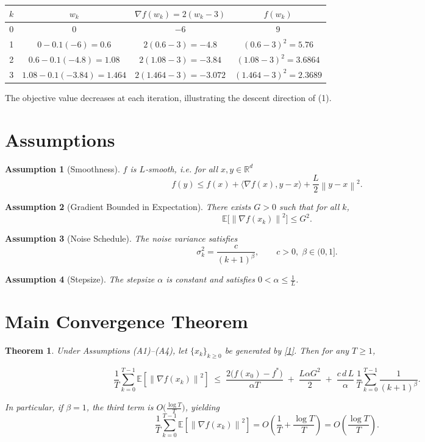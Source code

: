 \documentclass{article}
\newtheorem{theorem}{Theorem}
\newtheorem{assumption}{Assumption}
\newcommand{\E}{\mathbb{E}}
\newcommand{\R}{\mathbb{R}}
\newcommand{\norm}[1]{\left\|#1\right\|}
\newcommand{\ip}[2]{\langle #1,#2\rangle}
\begin{document}
\begin{center}
\begin{tabular}{c|c|c|c}
$k$ & $w_{k}$ & $\nabla f(w_{k})=2(w_{k}-3)$ & $f(w_{k})$\\ \hline
0 & $0$ & $-6$ & $9$\\
1 & $0-0.1(-6)=0.6$ & $2(0.6-3)=-4.8$ & $(0.6-3)^{2}=5.76$\\
2 & $0.6-0.1(-4.8)=1.08$ & $2(1.08-3)=-3.84$ & $(1.08-3)^{2}=3.6864$\\
3 & $1.08-0.1(-3.84)=1.464$ & $2(1.464-3)=-3.072$ & $(1.464-3)^{2}=2.3689$
\end{tabular}
\end{center}
The objective value decreases at each iteration, illustrating the descent direction of (1).

\newpage
\section*{Assumptions}
\begin{assumption}[Smoothness]
$f$ is $L$‑smooth, i.e. for all $x,y\in\R^{d}$
\[
f(y)\le f(x)+\ip{\nabla f(x)}{y-x}+\frac{L}{2}\norm{y-x}^{2}.
\tag{A1}
\]
\end{assumption}
\begin{assumption}[Gradient Bounded in Expectation]
There exists $G>0$ such that for all $k$,
\[
\E\bigl[\norm{\nabla f(x_{k})}^{2}\bigr]\le G^{2}.
\tag{A2}
\]
\end{assumption}
\begin{assumption}[Noise Schedule]
The noise variance satisfies
\[
\sigma_{k}^{2}= \frac{c}{(k+1)^{\beta}},\qquad c>0,\; \beta\in(0,1].
\tag{A3}
\]
\end{assumption}
\begin{assumption}[Stepsize]
The stepsize $\alpha$ is constant and satisfies $0<\alpha\le\frac{1}{L}$.
\end{assumption}

\section*{Main Convergence Theorem}
\begin{theorem}
\label{thm:main}
Under Assumptions (A1)–(A4), let $\{x_{k}\}_{k\ge0}$ be generated by \eqref{1}. Then for any $T\ge 1$,

\[
\frac{1}{T}\sum_{k=0}^{T-1}\E\!\left[\norm{\nabla f(x_{k})}^{2}\right]
\;\le\;
\frac{2\bigl(f(x_{0})-f^{*}\bigr)}{\alpha T}
\;+\;
\frac{L\alpha G^{2}}{2}
\;+\;
\frac{c\,d\,L}{\alpha}\,\frac{1}{T}\sum_{k=0}^{T-1}\frac{1}{(k+1)^{\beta}} .
\tag{3}
\]

In particular, if $\beta=1$, the third term is $O\!\bigl(\tfrac{\log T}{T}\bigr)$, yielding
\[
\frac{1}{T}\sum_{k=0}^{T-1}\E\!\left[\norm{\nabla f(x_{k})}^{2}\right]
=O\!\left(\frac{1}{T}+\frac{\log T}{T}\right)=O\!\left(\frac{\log T}{T}\right).
\]
\end{theorem}
\end{document}
